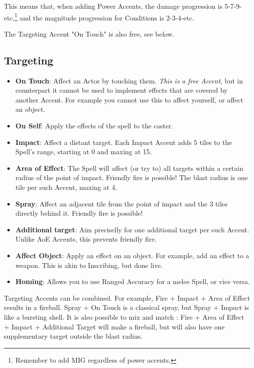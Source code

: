 This means that, when adding Power Accents, the damage progression is 5-7-9-etc.\footnote{Remember to add MIG regardless of power accents.} and the magnitude progression for Conditions is 2-3-4-etc.

The Targeting Accent "On Touch" is also free, see below.


\subsection{Targeting}

\begin{itemize}
    \item \textbf{On Touch}: Affect an Actor by touching them. \textit{This is a free Accent}, but in counterpart it cannot be used to implement effects that are covered by another Accent. For example you cannot use this to affect yourself, or affect an object.
    \item \textbf{On Self}: Apply the effects of the spell to the caster.
    \item \textbf{Impact}: Affect a distant target. Each Impact Accent adds 5 tiles to the Spell's range, starting at 0 and maxing at 15. 
    \item \textbf{Area of Effect}: The Spell will affect (or try to) all targets within a certain radius of the point of impact. Friendly fire is possible! The blast radius is one tile per such Accent, maxing at 4.
    \item \textbf{Spray}: Affect an adjacent tile from the point of impact and the 3 tiles directly behind it. Friendly fire is possible!
    \item \textbf{Additional target}: Aim preciselly for one additional target per such Accent. Unlike AoE Accents, this prevents friendly fire.
    \item \textbf{Affect Object}: Apply an effect on an object. For example, add an effect to a weapon. This is akin to Inscribing, but done live.
    \item \textbf{Homing}: Allows you to use Ranged Accuracy for a melee Spell, or vice versa.
\end{itemize}

Targeting Accents can be combined. For example, Fire + Impact + Area of Effect results in a fireball. Spray + On Touch is a classical spray, but Spray + Impact is like a bursting shell. It is also possible to mix and match : Fire + Area of Effect + Impact + Additional Target will make a fireball, but will also have one supplementary target outside the blast radius.

